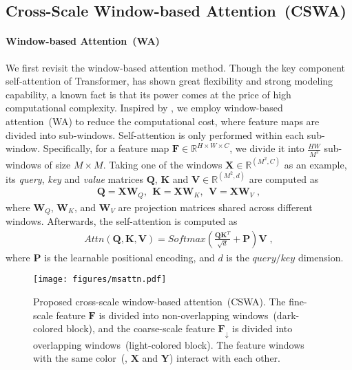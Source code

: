 \documentclass[10pt,twocolumn,letterpaper]{article}
\begin{document}
	
	\subsection{Cross-Scale Window-based Attention~(CSWA)}
	\label{sec:csma}
	
	\paragraph{Window-based Attention~(WA)}
	We first revisit the window-based attention method.
	Though the key component self-attention of Transformer, has shown great flexibility and strong modeling capability, a known fact is that its power comes at the price of high computational complexity. Inspired by \cite{liu2021swin,liang2021swinir}, we employ window-based attention~(WA) to reduce the computational cost, where feature maps are divided into sub-windows. Self-attention is only performed within each sub-window. Specifically, for a feature map $\bm{F} \in \mathbb{R}^{H\times W\times C}$, we divide it into $\frac{HW}{M^2}$ sub-windows of size $M\times M$.
	Taking one of the windows $\bm{X}\in \mathbb{R}^{(M^2, C)}$ as an example, its \textit{query}, \textit{key} and \textit{value} matrices $\bm{Q}$, $\bm{K}$ and $\bm{V}\in \mathbb{R}^{(M^2, d)}$ are computed as
	\begin{align}
	\bm{Q}=\bm{X}\bm{W}_Q,~~ \bm{K}=\bm{X}\bm{W}_{K},~~ \bm{V}=\bm{X}\bm{W}_{V} \;, 
	\label{eq:qkv}
	\end{align}
	where $\bm{W}_Q$, $\bm{W}_{K}$, and $\bm{W}_{V}$ are projection matrices shared across different windows. Afterwards, the self-attention is computed as
	\begin{align}
	Attn(\bm{Q},\bm{K},\bm{V})=Softmax(\frac{\bm{Q}\bm{K}^{T}}{\sqrt{d}}+\bm{P})\bm{V} \;,
	\label{eq:attn}
	\end{align}
	where $\bm{P}$ is the learnable positional encoding, and $d$ is the $query/key$ dimension.
	
	\begin{figure}[t]
		\begin{center}
\texttt{[image: figures/msattn.pdf]}
		\end{center}
		\vspace{-0.1in}
		\caption{Proposed cross-scale window-based attention~(CSWA). The fine-scale feature $\bm{F}$ is divided into non-overlapping windows~(dark-colored block), and the coarse-scale feature $\bm{F}_{\downarrow}$ is divided into overlapping windows~(light-colored block). The feature windows with the same color~(\eg, $\bm{X}$ and $\bm{Y}$) interact with each other.}
		\label{fig:msattn}
		\vspace{-0.1in}
	\end{figure}
	
\end{document}
